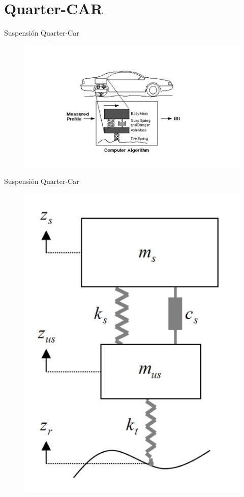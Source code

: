\documentclass{beamer}
\begin{document}
\section{Quarter-CAR}
\begin{frame}{Suspensión Quarter-Car}
\begin{figure}[h]
\centering
\includegraphics[scale=0.35]{quarter_susp}

\end{figure}
\end{frame}

\begin{frame}{Suspensión Quarter-Car}
 \begin{figure}[h]
\centering
\includegraphics[scale=0.35]{quarter-car}

\end{figure}

\vskip 1cm
\end{frame}
\end{document}
